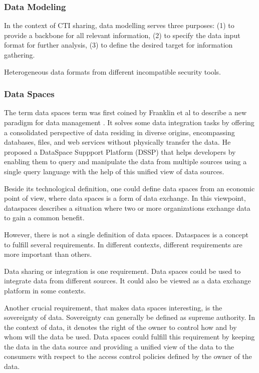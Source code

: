 \documentclass{article}
\begin{document}
\subsubsection*{Data Modeling}
In the context of CTI sharing, data modelling serves three purposes: (1) to provide a backbone for all relevant information, (2) to specify the data input format for further analysis, (3) to define the desired target for information gathering.

Heterogeneous data formats from different incompatible security tools.

\subsubsection*{Data Spaces}
The term data spaces term was first coined by Franklin et al to describe a new paradigm for data management \cite{franklin_databases_2005}. It solves some data integration tasks by offering a consolidated perspective of data residing in diverse origins, encompassing databases, files, and web services without physically transfer the data. He proposed a DataSpace Suppport Platform (DSSP) that helps developers by enabling them to query and manipulate the data from multiple sources using a single query language with the help of this unified view of data sources.

Beside its technological definition, one could define data spaces from an economic point of view, where data spaces is a form of data exchange. In this viewpoint, dataspaces describes a situation where two or more organizations exchange data to gain a common benefit. \cite{reiberg_what_2022}

However, there is not a single definition of data spaces. Dataspaces is a concept to fulfill several requirements. In different contexts, different requirements are more important than others. 

Data sharing or integration is one requirement. Data spaces could be used to integrate data from different sources. It could also be viewed as a data exchange platform in some contexts.

Another crucial requirement, that makes data spaces interesting, is the sovereignty of data. Sovereignty can generally be defined as supreme authority. In the context of data, it denotes the right of the owner to control how and by whom will the data be used. Data spaces could fulfill this requirement by keeping the data in the data source and providing a unified view of the data to the consumers with respect to the access control policies defined by the owner of the data.
\end{document}
